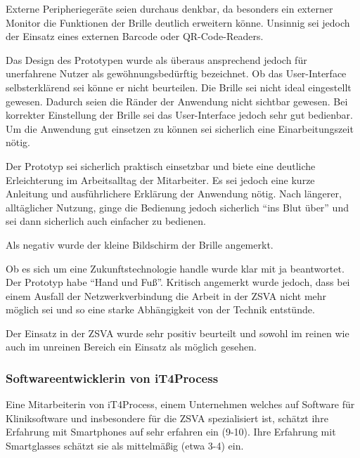 Externe Peripheriegeräte seien durchaus denkbar, da besonders ein externer Monitor die Funktionen der Brille deutlich erweitern könne. Unsinnig sei jedoch der Einsatz eines externen Barcode oder QR-Code-Readers.

Das Design des Prototypen wurde als überaus ansprechend jedoch für unerfahrene Nutzer als gewöhnungsbedürftig bezeichnet. Ob das User-Interface selbsterklärend sei könne er nicht beurteilen. Die Brille sei nicht ideal eingestellt gewesen. Dadurch seien die Ränder der Anwendung nicht sichtbar gewesen. Bei korrekter Einstellung der Brille sei das User-Interface jedoch sehr gut bedienbar. Um die Anwendung gut einsetzen zu können sei sicherlich eine Einarbeitungszeit nötig. 

Der Prototyp sei sicherlich praktisch einsetzbar und biete eine deutliche Erleichterung im Arbeitsalltag der Mitarbeiter. Es sei jedoch eine kurze Anleitung und ausführlichere Erklärung der Anwendung nötig. Nach längerer, alltäglicher Nutzung, ginge die Bedienung jedoch sicherlich \enquote{ins Blut über} und sei dann sicherlich auch einfacher zu bedienen. 

Als negativ wurde der kleine Bildschirm der Brille angemerkt. 

Ob es sich um eine Zukunftstechnologie handle wurde klar mit ja beantwortet. Der Prototyp habe \enquote{Hand und Fuß}. Kritisch angemerkt wurde jedoch, dass bei einem Ausfall der Netzwerkverbindung die Arbeit in der ZSVA nicht mehr möglich sei und so eine starke Abhängigkeit von der Technik entstünde.

Der Einsatz in der ZSVA wurde sehr positiv beurteilt und sowohl im reinen wie auch im unreinen Bereich ein Einsatz als möglich gesehen.
%
%
\subsubsection{Softwareentwicklerin von iT4Process}
%
Eine Mitarbeiterin von iT4Process, einem Unternehmen welches auf Software für Kliniksoftware und insbesondere für die ZSVA spezialisiert ist, schätzt ihre Erfahrung mit Smartphones auf sehr erfahren ein (9-10). Ihre Erfahrung mit Smartglasses schätzt sie als mittelmäßig (etwa 3-4) ein. 

